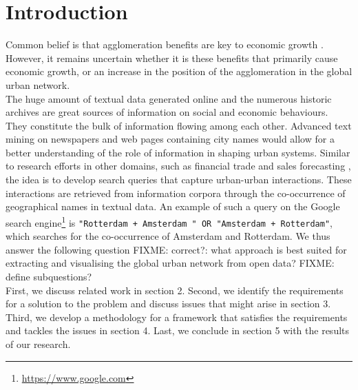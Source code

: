 \section{Introduction}



Common belief is that agglomeration benefits are key to economic growth \cite{porter2000location}. However, it remains uncertain whether it is these benefits that primarily cause economic growth, or an increase in the position of the agglomeration in the global urban network. \\

The huge amount of textual data generated online and the numerous historic archives are great sources of information on social and economic behaviours. They constitute the bulk of information flowing among each other. Advanced text mining on newspapers and web pages containing city names would allow for a better understanding of the role of information in shaping urban systems.
Similar to research efforts in other domains, such as financial trade \cite{preis2013quantifying} and sales forecasting \cite{wu2014future}, the idea is to develop search queries that capture urban-urban interactions. These interactions are retrieved from information corpora through the co-occurrence of geographical names in textual data. An example of such a query on the Google search engine\footnote{\url{https://www.google.com}} is \texttt{"Rotterdam + Amsterdam " OR "Amsterdam + Rotterdam"}, which searches for the co-occurrence of Amsterdam and Rotterdam. We thus answer the following question {\color{red} FIXME: correct?}: what approach is best suited for extracting and visualising the global urban network from open data? {\color{red}FIXME: define subquestions?}\\

First, we discuss related work in section 2. Second, we identify the requirements for a solution to the problem and discuss issues that might arise in section 3. Third, we develop a methodology for a framework that satisfies the requirements and tackles the issues in section 4. Last, we conclude in section 5 with the results of our research.

